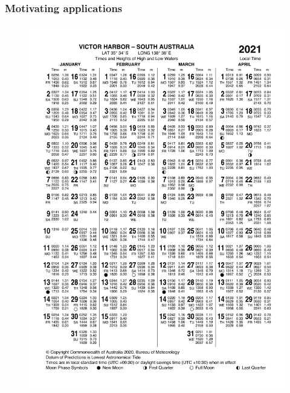 \begin{frame}
\frametitle{Motivating applications}
\begin{minipage}{0.45\textwidth}
    \begin{figure}      
    \includegraphics[height=\textheight]{figures/images/IDO59001_2021_SA_TP006.pdf}
    \end{figure}
\end{minipage}
\hfill
\begin{minipage}{0.45\textwidth}
    \begin{figure}      

\end{figure}
\end{minipage}
\end{frame}
